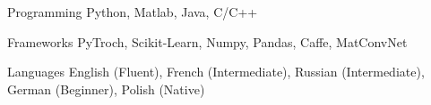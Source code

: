 

\begin{cvskills}

  \cvskill
    {Programming} %
    {Python, Matlab, Java, C/C++} %

  \cvskill
    {Frameworks} %
    {PyTroch, Scikit-Learn, Numpy, Pandas, Caffe, MatConvNet} %

  \cvskill
    {Languages} %
    {English (Fluent), French (Intermediate), Russian (Intermediate), German (Beginner), Polish (Native)} %

\end{cvskills}
